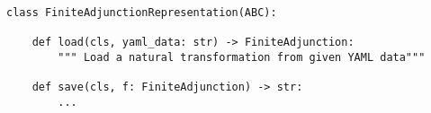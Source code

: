 \begin{verbatim}
class FiniteAdjunctionRepresentation(ABC):

    def load(cls, yaml_data: str) -> FiniteAdjunction:
        """ Load a natural transformation from given YAML data"""

    def save(cls, f: FiniteAdjunction) -> str:
        ...
\end{verbatim}